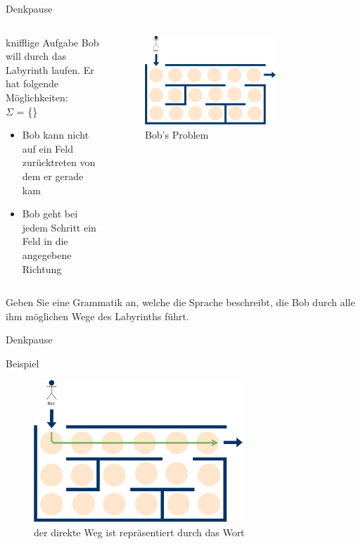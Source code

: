 {
\begin{frame}{Denkpause}
    \begin{columns}
    \begin{alertblock}{knifflige Aufgabe}
    Bob will durch das Labyrinth laufen. Er hat folgende Möglichkeiten:\\
    $\Sigma$ = \{\text{\Rewind, \MoveUp, \Forward, \MoveDown}\}
    \begin{itemize}
        \item Bob kann nicht auf ein Feld zurücktreten von dem er gerade kam
        \item Bob geht bei jedem Schritt ein Feld in die angegebene Richtung
    \end{itemize}
    \end{alertblock}
\begin{figure}
        \centering
        \includegraphics[width=0.7\textwidth]{figures/GBeispiel.png}
        \caption{Bob's Problem}
        
    \end{figure}
\end{columns}
\alert{Geben Sie eine Grammatik an, welche die Sprache beschreibt, die Bob durch alle ihm möglichen Wege des Labyrinths führt.}
\end{frame}
}

{
\begin{frame}{Denkpause}
    \begin{alertblock}{Beispiel}
    \begin{figure}
        \centering
        \includegraphics[width=0.7\textwidth]{figures/GBeispiel1.png}
        \caption{der direkte Weg ist repräsentiert durch das Wort \alert{\MoveDown\Forward\Forward\Forward\Forward\Forward\Forward}}
    \end{figure}
    \end{alertblock}
\end{frame}
}  

